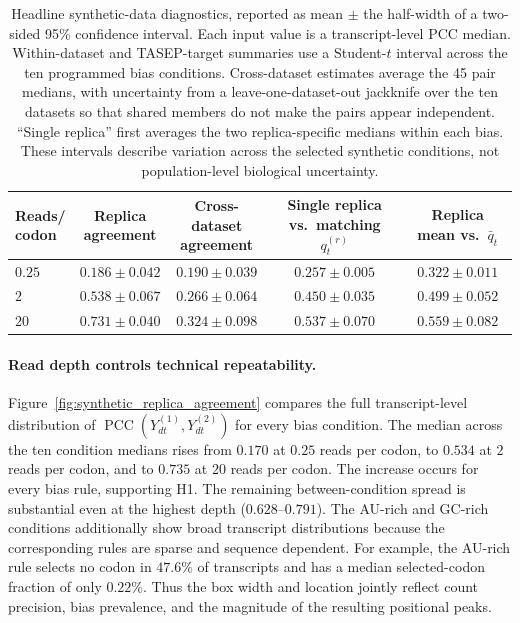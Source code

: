 \begin{table}[t]
    \centering
    \footnotesize
    \caption{Headline synthetic-data diagnostics, reported as mean $\pm$ the
    half-width of a two-sided 95\% confidence interval.  Each input value is a
    transcript-level PCC median.  Within-dataset and TASEP-target summaries use a
    Student-$t$ interval across the ten programmed bias conditions.
    Cross-dataset estimates average the 45 pair medians, with uncertainty from
    a leave-one-dataset-out jackknife over the ten datasets so that shared
    members do not make the pairs appear independent.  ``Single replica''
    first averages the two replica-specific medians within each bias.  These
    intervals describe variation across the selected synthetic conditions,
    not population-level biological uncertainty.}
    \label{tab:synthetic_data_diagnostics}
    \setlength{\tabcolsep}{4pt}
    \begin{tabular}{@{}lcccc@{}}
        \toprule
        \shortstack{Reads/\\codon}
        & \shortstack{Replica\\agreement}
        & \shortstack{Cross-dataset\\agreement}
        & \shortstack{Single replica\\vs.\ matching $q_t^{(r)}$}
        & \shortstack{Replica mean\\vs.\ $\bar q_t$} \\
        \midrule
        $0.25$ & $0.186 \pm 0.042$ & $0.190 \pm 0.039$ & $0.257 \pm 0.005$ & $0.322 \pm 0.011$ \\
        $2$    & $0.538 \pm 0.067$ & $0.266 \pm 0.064$ & $0.450 \pm 0.035$ & $0.499 \pm 0.052$ \\
        $20$   & $0.731 \pm 0.040$ & $0.324 \pm 0.098$ & $0.537 \pm 0.070$ & $0.559 \pm 0.082$ \\
        \bottomrule
    \end{tabular}
\end{table}

\paragraph{Read depth controls technical repeatability.}
Figure~\ref{fig:synthetic_replica_agreement} compares the full transcript-level
distribution of
$\operatorname{PCC}(Y^{(1)}_{dt},Y^{(2)}_{dt})$ for every bias condition.  The
median across the ten condition medians rises from $0.170$ at $0.25$ reads per
codon, to $0.534$ at $2$ reads per codon, and to $0.735$ at $20$ reads per
codon.  The increase occurs for every bias rule, supporting H1.  The remaining
between-condition spread is substantial even at the highest depth
($0.628$--$0.791$).  The AU-rich and GC-rich conditions additionally show broad
transcript distributions because the corresponding rules are sparse and
sequence dependent.  For example, the AU-rich rule selects no codon in
$47.6\%$ of transcripts and has a median selected-codon fraction of only
$0.22\%$.  Thus the box width and location jointly reflect count precision,
bias prevalence, and the magnitude of the resulting positional peaks.

